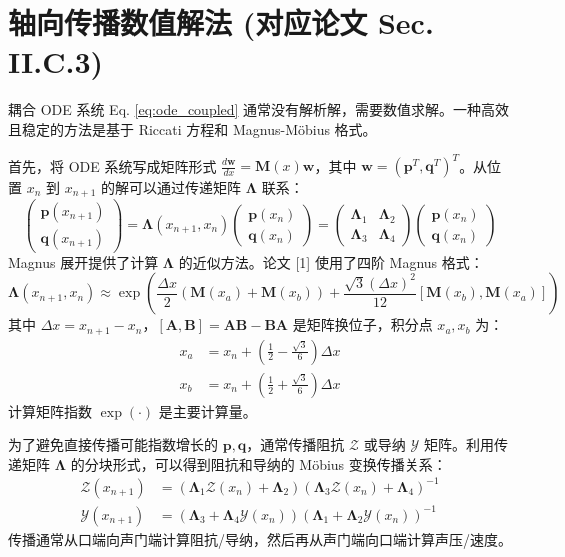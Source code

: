\documentclass{ctexart}
\begin{document}
\section{轴向传播数值解法 (对应论文 Sec. II.C.3)}
耦合 ODE 系统 Eq. \eqref{eq:ode_coupled} 通常没有解析解，需要数值求解。一种高效且稳定的方法是基于 Riccati 方程和 Magnus-Möbius 格式。

首先，将 ODE 系统写成矩阵形式 $\frac{d\mathbf{w}}{dx} = \mathbf{M}(x) \mathbf{w}$，其中 $\mathbf{w} = (\mathbf{p}^T, \mathbf{q}^T)^T$。从位置 $x_n$ 到 $x_{n+1}$ 的解可以通过传递矩阵 $\mathbf{\Lambda}$ 联系：
\begin{equation} \label{eq:transfer_matrix}
\begin{pmatrix} \mathbf{p}(x_{n+1}) \\
\mathbf{q}(x_{n+1}) \end{pmatrix}
= \mathbf{\Lambda}(x_{n+1}, x_n)
\begin{pmatrix} \mathbf{p}(x_n) \\
\mathbf{q}(x_n) \end{pmatrix}
=
\begin{pmatrix}
\mathbf{\Lambda}_1 & \mathbf{\Lambda}_2 \\
\mathbf{\Lambda}_3 & \mathbf{\Lambda}_4
\end{pmatrix}
\begin{pmatrix} \mathbf{p}(x_n) \\
\mathbf{q}(x_n) \end{pmatrix}
\end{equation}
Magnus 展开提供了计算 $\mathbf{\Lambda}$ 的近似方法。论文 [1] 使用了四阶 Magnus 格式：
\begin{equation} \label{eq:magnus4}
\mathbf{\Lambda}(x_{n+1}, x_n) \approx \exp \left( \frac{\Delta x}{2} (\mathbf{M}(x_a) + \mathbf{M}(x_b)) + \frac{\sqrt{3}(\Delta x)^2}{12} [\mathbf{M}(x_b), \mathbf{M}(x_a)] \right)
\end{equation}
其中 $\Delta x = x_{n+1} - x_n$，$[\mathbf{A}, \mathbf{B}] = \mathbf{A}\mathbf{B} - \mathbf{B}\mathbf{A}$ 是矩阵换位子，积分点 $x_a, x_b$ 为：
\begin{align}
x_a &= x_n + (\frac{1}{2} - \frac{\sqrt{3}}{6}) \Delta x \\
x_b &= x_n + (\frac{1}{2} + \frac{\sqrt{3}}{6}) \Delta x
\end{align}
计算矩阵指数 $\exp(\cdot)$ 是主要计算量。

为了避免直接传播可能指数增长的 $\mathbf{p}, \mathbf{q}$，通常传播阻抗 $\boldsymbol{\mathcal{Z}}$ 或导纳 $\boldsymbol{\mathcal{Y}}$ 矩阵。利用传递矩阵 $\mathbf{\Lambda}$ 的分块形式，可以得到阻抗和导纳的 Möbius 变换传播关系：
\begin{align}
\boldsymbol{\mathcal{Z}}(x_{n+1}) &= (\mathbf{\Lambda}_1 \boldsymbol{\mathcal{Z}}(x_n) + \mathbf{\Lambda}_2) (\mathbf{\Lambda}_3 \boldsymbol{\mathcal{Z}}(x_n) + \mathbf{\Lambda}_4)^{-1} \label{eq:impedance_prop} \\
\boldsymbol{\mathcal{Y}}(x_{n+1}) &= (\mathbf{\Lambda}_3 + \mathbf{\Lambda}_4 \boldsymbol{\mathcal{Y}}(x_n)) (\mathbf{\Lambda}_1 + \mathbf{\Lambda}_2 \boldsymbol{\mathcal{Y}}(x_n))^{-1} \label{eq:admittance_prop}
\end{align}
传播通常从口端向声门端计算阻抗/导纳，然后再从声门端向口端计算声压/速度。
\end{document}
